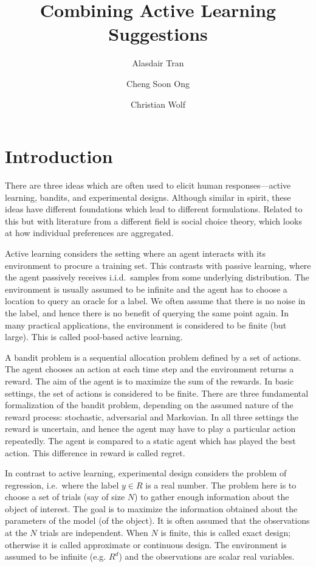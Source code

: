 \documentclass[fleqn,10pt,lineno]{wlpeerj} %
\title{Combining Active Learning Suggestions}
\author[1]{Alasdair Tran}
\author[2]{Cheng Soon Ong}
\author[3]{Christian Wolf}
\affil[1]{Computational Media Lab, Australian National University}
\affil[2]{Machine Learning Research Group, Data61, CSIRO, Australia}
\affil[3]{Research School of Astronomy and Astrophysics, Australian National
          University}
\begin{document}
\flushbottom
\maketitle
\thispagestyle{empty}

\section*{Introduction}

There are three ideas which are often used to elicit human responses---active
learning, bandits, and experimental designs. Although similar in spirit, these
ideas have different foundations which lead to different formulations. Related
to this but with literature from a different field is social choice theory,
which looks at how individual preferences are aggregated.

Active learning considers the setting where an agent interacts with its
environment to procure a training set. This contrasts with passive learning,
where the agent passively receives i.i.d.\, samples from some underlying
distribution. The environment is usually assumed to be infinite and the agent
has to choose a location to query an oracle for a label. We often assume
that there is no noise in the label, and hence there is no benefit of querying
the same point again. In many practical applications, the environment is
considered to be finite (but large). This is called pool-based active
learning.

A bandit problem is a sequential allocation problem defined by a set of
actions. The agent chooses an action at each time step and the environment
returns a reward. The aim of the agent is to maximize the sum of the rewards.
In basic settings, the set of actions is considered to be finite. There are
three fundamental formalization of the bandit problem, depending on the assumed
nature of the reward process: stochastic, adversarial and Markovian. In all
three settings the reward is uncertain, and hence the agent may have to play a
particular action repeatedly. The agent is compared to a static agent which has
played the best action. This difference in reward is called regret.

In contrast to active learning, experimental design considers the problem of
regression, i.e.\, where the label $y\in R$ is a real number. The problem here
is to choose a set of trials (say of size $N$) to gather enough information
about the object of interest. The goal is to maximize the information obtained
about the parameters of the model (of the object). It is often assumed that the
observations at the $N$ trials are independent. When $N$ is finite, this is
called exact design; otherwise it is called approximate or continuous design.
The environment is assumed to be infinite (e.g. $R^d$) and the observations are
scalar real variables.
\end{document}

